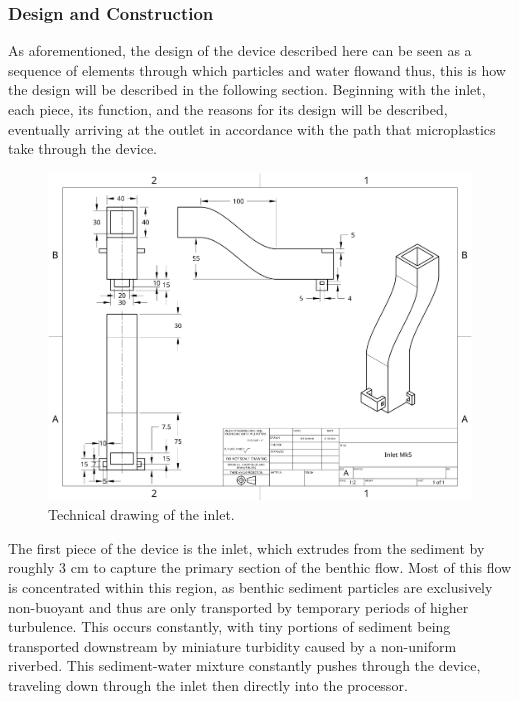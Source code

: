 \documentclass[fleqn,10pt]{SelfArx} %
\begin{document}
	\subsubsection{Design and Construction}
	As aforementioned, the design of the device described here can be seen as a sequence of elements through which particles and water flow\textemdash and thus, this is how the design will be described in the following section. Beginning with the inlet, each piece, its function, and the reasons for its design will be described, eventually arriving at the outlet in accordance with the path that microplastics take through the device. 
	\begin{figure}[h]
		\centering
		\includegraphics[width=1\linewidth]{Figures/TechInlet}
		\caption[Inlet Tech. Drawing]{Technical drawing of the inlet.}
		\label{fig:techinlet}
	\end{figure}
	The first piece of the device is the inlet, which extrudes from the sediment by roughly 3 cm to capture the primary section of the \gls{benthic} flow. Most of this flow is concentrated within this region, as \gls{benthic} sediment particles are exclusively non-buoyant and thus are only transported by temporary periods of higher turbulence. This occurs constantly, with tiny portions of sediment being transported downstream by miniature turbidity caused by a non-uniform riverbed. This sediment-water mixture constantly pushes through the device, traveling down through the inlet then directly into the processor. 
\end{document}
